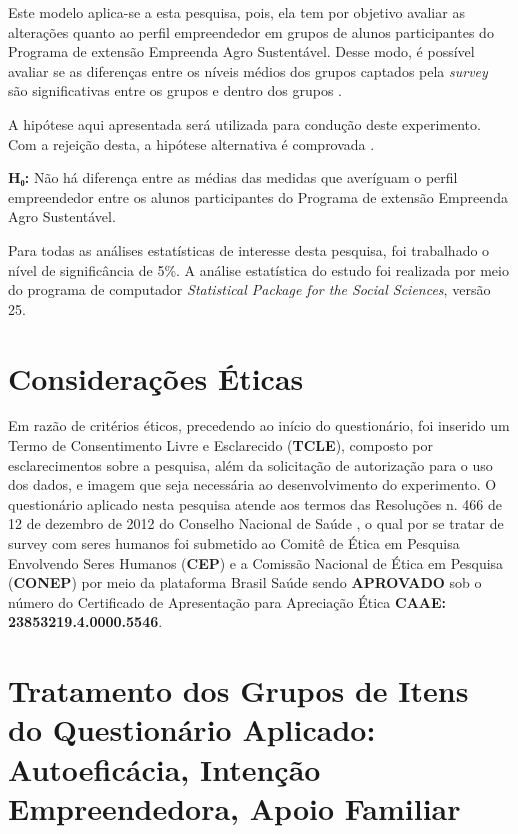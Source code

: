Este modelo aplica-se a esta pesquisa, pois, ela tem por objetivo avaliar as alterações quanto ao perfil empreendedor em grupos de alunos participantes do Programa de extensão Empreenda Agro Sustentável. Desse modo, é possível avaliar se as diferenças entre os níveis médios dos grupos captados pela \textit{survey} são significativas entre os grupos e dentro dos grupos \cite{rocha_avaliacao_2014}.

A hipótese aqui apresentada será utilizada para condução deste experimento. Com a rejeição desta, a hipótese alternativa é comprovada \cite{hair_alise_2009}.

\textbf{H₀:} Não há diferença entre as médias das medidas que averíguam o perfil empreendedor entre os alunos participantes do Programa de extensão Empreenda Agro Sustentável.

Para todas as análises estatísticas de interesse desta pesquisa, foi trabalhado o nível de significância de 5\%. A análise estatística do estudo foi realizada por meio do programa de computador \textit{Statistical Package for the Social Sciences}, \cite{ibm_corp_ibm_2017} versão 25. 

\section{Considerações Éticas}

Em razão de critérios éticos, precedendo ao início do questionário, foi inserido um Termo de Consentimento Livre e Esclarecido (\textbf{TCLE}), composto por esclarecimentos sobre a pesquisa, além da solicitação de autorização para o uso dos dados, e imagem que seja necessária ao desenvolvimento do experimento. O questionário aplicado nesta pesquisa atende aos termos das Resoluções n. 466 de 12 de dezembro de 2012 do Conselho Nacional de Saúde \cite{cns_resolucao_2012}, o qual por se tratar de survey com seres humanos foi submetido ao Comitê de Ética em Pesquisa Envolvendo Seres Humanos (\textbf{CEP}) e a Comissão Nacional de Ética em Pesquisa (\textbf{CONEP}) por meio da plataforma Brasil Saúde sendo \textbf{APROVADO} sob o número do Certificado de Apresentação para Apreciação Ética \textbf{CAAE: 23853219.4.0000.5546}.

\section{Tratamento dos Grupos de Itens do Questionário Aplicado: Autoeficácia, Intenção Empreendedora, Apoio Familiar}

